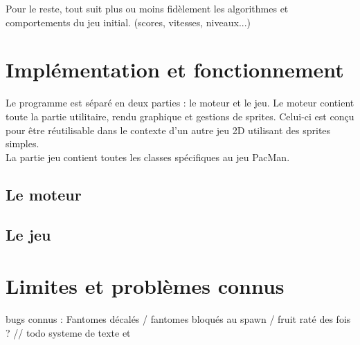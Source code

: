 \documentclass [twoside,a4paper,11pt,french] {report}
\begin{document}
    Pour le reste, tout suit plus ou moins fidèlement les algorithmes et comportements du jeu initial.
    (scores, vitesses, niveaux...)

\chapter{Implémentation et fonctionnement}
    Le programme est séparé en deux parties : le moteur et le jeu. Le moteur contient toute la partie utilitaire,
    rendu graphique et gestions de sprites. Celui-ci est conçu pour être
    réutilisable dans le contexte d'un autre jeu 2D utilisant des sprites simples. \\
    La partie jeu contient toutes les classes spécifiques au jeu PacMan.

\section{Le moteur}

\section{Le jeu}
\chapter{Limites et problèmes connus}
    bugs connus : Fantomes décalés / fantomes bloqués au spawn / fruit raté des fois ?
    // todo systeme de texte et 
\end{document}
